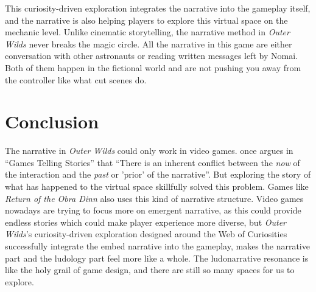 \documentclass[mla7]{mla}
\begin{document}
This curiosity-driven exploration integrates the narrative into the gameplay
itself, and the narrative is also helping players to explore this virtual space
on the mechanic level. Unlike cinematic storytelling, the narrative method in
\textit{Outer Wilds} never breaks the magic circle. All the narrative in this
game are either conversation with other astronauts or reading written messages
left by Nomai. Both of them happen in the fictional world and are not pushing
you away from the controller like what cut scenes do.
\section{Conclusion}
The narrative in \textit{Outer Wilds} could only work in video
games. \cite{juul2001games} once argues in ``Games Telling Stories'' that
``There is an inherent conflict between the \textit{now} of the interaction and
the \textit{past} or 'prior' of the narrative''. But exploring the story of what
has happened to the virtual space skillfully solved this problem. Games like
\textit{Return of the Obra Dinn} also uses this kind of narrative
structure. Video games nowadays are trying to focus more on emergent narrative,
as this could provide endless stories which could make player experience more
diverse, but \textit{Outer Wilds}'s curiosity-driven exploration designed around
the Web of Curiosities successfully integrate the embed narrative into the
gameplay, makes the narrative part and the ludology part feel more like a
whole. The ludonarrative resonance is like the holy grail of game design, and
there are still so many spaces for us to explore.
\begin{paper}
\end{paper}
\begin{workscited}
\printbibliography[heading=none]
\end{workscited}
\end{document}

